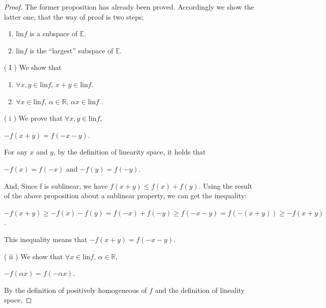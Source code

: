 \documentclass[a4paper,11pt]{jsarticle}
\begin{document}
\begin{proof}
  The former proposition has already been proved. Accordingly we show the latter one, that the way of proof is two steps;

  \begin{enumerate}[label=\Roman*,align=CenterWithParen]
    \item lin$f$ is a subspace of $\mathbb{E}$.
    \item lin$f$ is the ``largest'' subspace of $\mathbb{E}$.
  \end{enumerate}

  ( $\mathrm{I}$ ) We show that

  \begin{enumerate}[label=\roman*,align=CenterWithParen]
    \item $\forall x, y \in \text{lin} f$, $x + y \in \text{lin} f$.
    \item $\forall x \in \text{lin} f$, $\alpha \in{\mathbb{R}}$, $\alpha x \in \text{lin} f$ .
  \end{enumerate}

  ( $\mathrm{i}$ ) We prove that $\forall x, y \in \text{lin}f$,

  \begin{center}
    $-f(x+y) = f(-x-y)$.
  \end{center}

  For any $x$ and $y$, by the definition of linearity space, it holds that

  \begin{center}
    $-f(x) = f(-x)$ and
    $-f(y) = f(-y)$.
  \end{center}

  And, Since f is sublinear, we have $f(x + y) \leq f(x) + f(y)$. Using the result of the above proposition about a sublinear property, we can get the inequality:

  \begin{center}
    $-f(x+y) \geq - f(x) - f(y) = f(-x) + f(-y) \geq f(-x-y) = f(-(x+y)) \geq -f(x+y)$.
  \end{center}

  This inequality means that $-f(x+y) = f(-x-y)$.

  ( $\mathrm{ii}$ ) We show that $\forall x \in \text{lin}f$, $\alpha \in{\mathbb{R}}$,

  \begin{center}
    $-f(\alpha x) = f(-\alpha x)$.
  \end{center}

  By the definition of positively homogeneous of $f$ and the definition of lineality space,


\end{proof}
\end{document}
